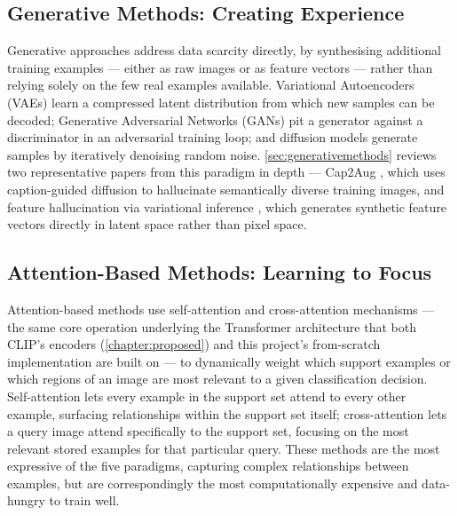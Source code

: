 \documentclass{iutbscthesis}
\begin{document}
\subsection{Generative Methods: Creating Experience}
Generative approaches address data scarcity directly, by synthesising additional training examples --- either as raw images or as feature vectors --- rather than relying solely on the few real examples available. Variational Autoencoders (VAEs) learn a compressed latent distribution from which new samples can be decoded; Generative Adversarial Networks (GANs) pit a generator against a discriminator in an adversarial training loop; and diffusion models generate samples by iteratively denoising random noise. \autoref{sec:generativemethods} reviews two representative papers from this paradigm in depth --- Cap2Aug \cite{sharma2024cap2aug}, which uses caption-guided diffusion to hallucinate semantically diverse training images, and feature hallucination via variational inference \cite{luo2021fewshot}, which generates synthetic feature vectors directly in latent space rather than pixel space.

\subsection{Attention-Based Methods: Learning to Focus}
Attention-based methods use self-attention and cross-attention mechanisms --- the same core operation underlying the Transformer architecture \cite{vaswani2017attention} that both CLIP's encoders (\autoref{chapter:proposed}) and this project's from-scratch implementation are built on --- to dynamically weight which support examples or which regions of an image are most relevant to a given classification decision. Self-attention lets every example in the support set attend to every other example, surfacing relationships within the support set itself; cross-attention lets a query image attend specifically to the support set, focusing on the most relevant stored examples for that particular query. These methods are the most expressive of the five paradigms, capturing complex relationships between examples, but are correspondingly the most computationally expensive and data-hungry to train well.
\end{document}
